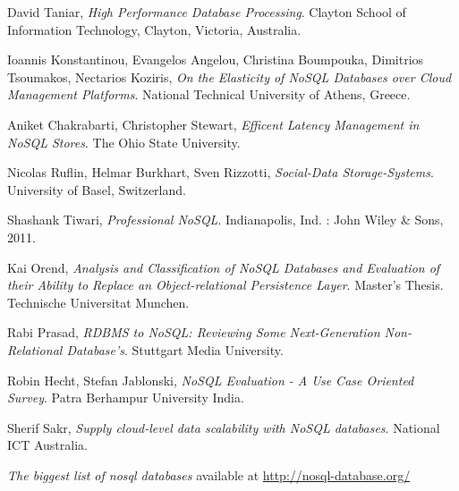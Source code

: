 \documentclass[times, 10pt,twocolumn]{article}
\begin{document}
\begin{thebibliography}{9}
  	  David Taniar, 
      \emph{High Performance Database Processing}. Clayton School of Information Technology, Clayton, Victoria, Australia.
      
  	  Ioannis Konstantinou, Evangelos Angelou, Christina Boumpouka, Dimitrios Tsoumakos, Nectarios Koziris, 
      \emph{On the Elasticity of NoSQL Databases over Cloud Management Platforms}. National Technical University of Athens, Greece.
      
  	  Aniket Chakrabarti, Christopher Stewart,
      \emph{Efficent Latency Management in NoSQL Stores}. The Ohio State University.
      
  	  Nicolas Ruﬂin, Helmar Burkhart, Sven Rizzotti, 
      \emph{Social-Data Storage-Systems}.  University of Basel, Switzerland.
      
  	  Shashank Tiwari, 
      \emph{Professional NoSQL}. Indianapolis, Ind. : John Wiley \& Sons, 2011.
      
  	  Kai Orend, 
      \emph{Analysis and Classification of NoSQL Databases and Evaluation of their Ability to Replace an Object-relational Persistence Layer}. Master's Thesis. Technische Universitat Munchen.
      
  	  Rabi Prasad, 
      \emph{RDBMS to NoSQL: Reviewing Some Next-Generation Non-Relational Database's}. Stuttgart Media University.
      
  	  Robin Hecht, Stefan Jablonski,
      \emph{NoSQL Evaluation - A Use Case Oriented Survey}. Patra Berhampur University India.
      
  	  Sherif Sakr, 
      \emph{Supply cloud-level data scalability with NoSQL databases}. National ICT Australia.
      
      \emph{The biggest list of nosql databases} available at
      \url{http://nosql-database.org/}
      
      
\end{thebibliography}

\nocite{ex1,ex2}
 



\end{document}
